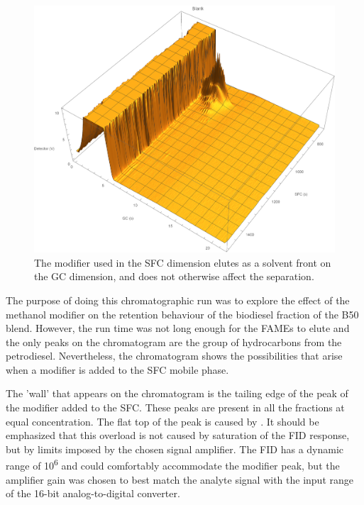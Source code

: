 \begin{figure}
	\centering
	\includegraphics[width=\textwidth]{Figures/Modifier.pdf}
	\decoRule	
	
	\caption[Modifiers in SFC]{The modifier used in the SFC dimension elutes as a
solvent front on the GC dimension, and does not otherwise affect the separation.}
	
	\label{fig:Modifier} 
\end{figure}

The purpose of doing this chromatographic run was to explore the effect of the
methanol modifier on the retention behaviour of the biodiesel fraction of the
B50 blend. However, the run time was not long enough for the FAMEs to elute and
the only peaks on the chromatogram are the group of hydrocarbons from the
petrodiesel. Nevertheless, the chromatogram shows the possibilities that arise
when a modifier is added to the SFC mobile phase.

The 'wall' that appears on the chromatogram is the tailing edge of the peak of
the modifier added to the SFC. These peaks are present in all the fractions at
equal concentration. The flat top of the peak is caused by . It should be emphasized that this overload is not caused by
saturation of the FID response, but by limits imposed by the chosen signal
amplifier. The FID has a dynamic range of 10\textsuperscript{6} and could
comfortably accommodate the modifier peak, but the amplifier gain was chosen to
best match the analyte signal with the input range of the 16-bit
analog-to-digital converter.

